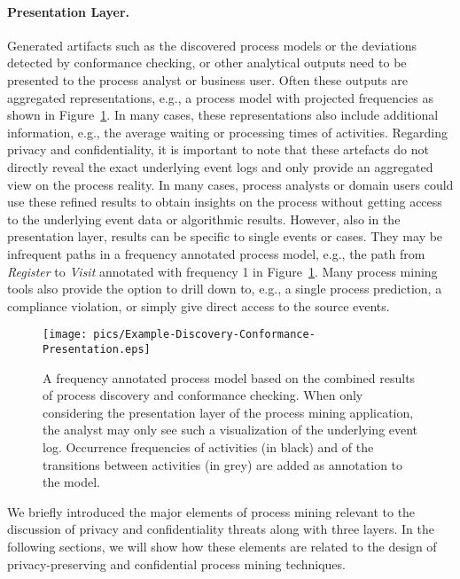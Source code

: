 \documentclass[manuscript]{acmart}
\begin{document}
\paragraph{Presentation Layer.} Generated artifacts such as the discovered process models or the deviations detected by conformance checking, or other analytical outputs need to be presented to the process analyst or business user. Often these outputs are aggregated representations, e.g., a process model with projected frequencies as shown in Figure~\ref{fig:processModelPresentation}. In many cases, these representations also include additional information, e.g., the average waiting or processing times of activities. Regarding privacy and confidentiality, it is important to note that these artefacts do not directly reveal the exact underlying event logs and only provide an aggregated view on the process reality. In many cases, process analysts or domain users could use these refined results to obtain insights on the process without getting access to the underlying event data or algorithmic results.  
However, also in the presentation layer, results can be specific to single events or cases. They may be infrequent paths in a frequency annotated process model, e.g., the path from \emph{Register} to \emph{Visit} annotated with frequency 1 in Figure~\ref{fig:processModelPresentation}. Many process mining tools also provide the option to drill down to, e.g., a single process prediction, a compliance violation, or simply give direct access to the source events.

\begin{figure}[tb]
    \centering
    \texttt{[image: pics/Example-Discovery-Conformance-Presentation.eps]}
    \caption{A frequency annotated process model based on the combined results of process discovery and conformance checking. When only considering the presentation layer of the process mining application, the analyst may only see such a visualization of the underlying event log. Occurrence frequencies of activities (in black) and of the transitions between activities (in grey) are added as annotation to the model.}
    \label{fig:processModelPresentation}
\end{figure}

We briefly introduced the major elements of process mining relevant to the discussion of privacy and confidentiality threats along with three layers. In the following sections, we will show how these elements are related to the design of privacy-preserving and confidential process mining techniques. 
\end{document}
